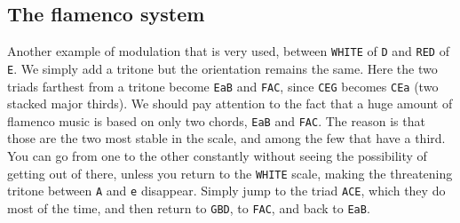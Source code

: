 \documentclass[]{report}
\begin{document}
\subsection{The flamenco system}
Another example of modulation that is very used, between \texttt{WHITE} of \texttt{D} and \texttt{RED} of \texttt{E}. We simply add a tritone but the orientation remains the same. Here the two triads farthest from a tritone become \texttt{EaB} and \texttt{FAC}, since \texttt{CEG} becomes \texttt{CEa} (two stacked major thirds).
We should pay attention to the fact that a huge amount of flamenco music is based on only two chords, \texttt{EaB} and \texttt{FAC}. The reason is that those are the two most stable in the scale, and among the few that have a third. You can go from one to the other constantly without seeing the possibility of getting out of there, unless you return to the \texttt{WHITE} scale, making the threatening tritone between \texttt{A} and \texttt{e} disappear. Simply jump to the triad \texttt{ACE}, which they do most of the time, and then return to \texttt{GBD}, to \texttt{FAC}, and back to \texttt{EaB}.
\end{document}
